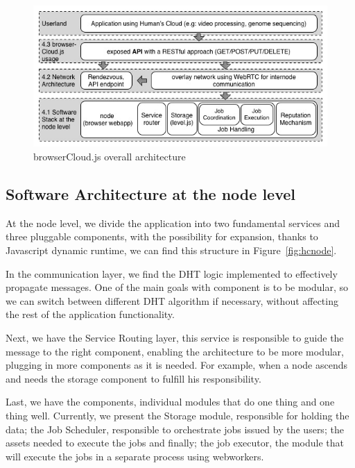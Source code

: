 \begin{figure}[h!]
  \centering
  \includegraphics[width=\textwidth]{img/softwarestack.jpg}
  \caption{browserCloud.js overall architecture}
  \label{fig:softwarestack}
\end{figure}


\subsection{Software Architecture at the node level}

At the node level, we divide the application into two fundamental services and three pluggable components, with the possibility for expansion, thanks to Javascript dynamic runtime, we can find this structure in Figure~\ref{fig:hcnode}.

In the communication layer, we find the DHT logic implemented to effectively propagate messages. One of the main goals with component is to be modular, so we can switch between different DHT algorithm if necessary, without affecting the rest of the application functionality.

Next, we have the Service Routing layer, this service is responsible to guide the message to the right component, enabling the architecture to be more modular, plugging in more components as it is needed. For example, when a node ascends and needs the storage component to fulfill his responsibility.

Last, we have the components, individual modules that do one thing and one thing well. Currently, we present the Storage module, responsible for holding the data; the Job Scheduler, responsible to orchestrate jobs issued by the users; the assets needed to execute the jobs and finally; the job executor, the module that will execute the jobs in a separate process using webworkers.


